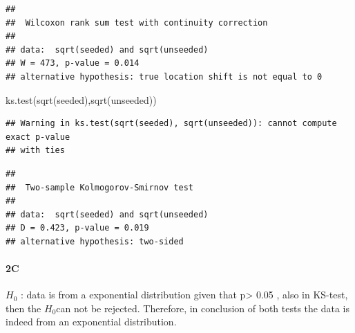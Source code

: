 \documentclass[
]{article}
\newenvironment{Shaded}{\begin{snugshade}}{\end{snugshade}}
\newcommand{\FunctionTok}[1]{\textcolor[rgb]{0.00,0.00,0.00}{#1}}
\newcommand{\NormalTok}[1]{#1}
\begin{document}
\begin{verbatim}
## 
##  Wilcoxon rank sum test with continuity correction
## 
## data:  sqrt(seeded) and sqrt(unseeded)
## W = 473, p-value = 0.014
## alternative hypothesis: true location shift is not equal to 0
\end{verbatim}

\begin{Shaded}
\begin{Highlighting}[]
\FunctionTok{ks.test}\NormalTok{(}\FunctionTok{sqrt}\NormalTok{(seeded),}\FunctionTok{sqrt}\NormalTok{(unseeded))}
\end{Highlighting}
\end{Shaded}

\begin{verbatim}
## Warning in ks.test(sqrt(seeded), sqrt(unseeded)): cannot compute exact p-value
## with ties
\end{verbatim}

\begin{verbatim}
## 
##  Two-sample Kolmogorov-Smirnov test
## 
## data:  sqrt(seeded) and sqrt(unseeded)
## D = 0.423, p-value = 0.019
## alternative hypothesis: two-sided
\end{verbatim}

\hypertarget{c-1}{%
\paragraph{\texorpdfstring{\textbf{2C}}{2C}}\label{c-1}}

\(H_0\) : data is from a exponential distribution given that
p\textgreater{} 0.05 , also in KS-test, then the \(H_0\)can not be
rejected. Therefore, in conclusion of both tests the data is indeed from
an exponential distribution.
\end{document}
